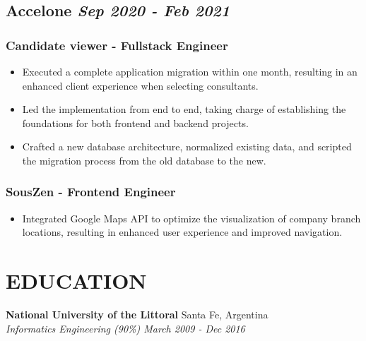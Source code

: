 \documentclass[12pt, letterpaper]{article}
\begin{document}
\subsection*{Accelone \hfill \small \textit{Sep 2020 - Feb 2021}}

\subsubsection*{Candidate viewer - Fullstack Engineer}
\begin{itemize}
    \setlength\itemsep{0em}
    \item Executed a complete application migration within one month, resulting in an enhanced client experience when selecting consultants.
    \item Led the implementation from end to end, taking charge of establishing the foundations for both frontend and backend projects.
    \item Crafted a new database architecture, normalized existing data, and scripted the migration process from the old database to the new.
\end{itemize}

\subsubsection*{SousZen - Frontend Engineer}
\begin{itemize}
    \setlength\itemsep{0em}
    \item Integrated Google Maps API to optimize the visualization of company branch locations, resulting in enhanced user experience and improved navigation.
\end{itemize}

\section{EDUCATION}

\textbf{National University of the Littoral} \hfill Santa Fe, Argentina \\
\textit{Informatics Engineering (90\%) \hfill March 2009 - Dec 2016} 
\end{document}
